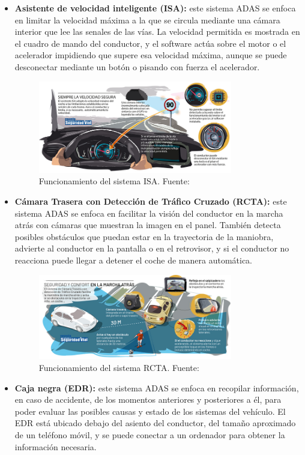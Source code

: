 \documentclass[12pt]{report} %
\begin{document}
\begin{itemize}
	\item \textbf{Asistente de velocidad inteligente (ISA):} este sistema ADAS se enfoca en limitar la velocidad máxima a la que se circula mediante una cámara interior que lee las senales de las vías. La velocidad permitida es mostrada en el cuadro de mando del conductor, y el software actúa sobre el motor o el acelerador impidiendo que supere esa velocidad máxima, aunque se puede desconectar mediante un botón o pisando con fuerza el acelerador.
    \begin{figure}[H]
		\centering
		\includegraphics[width=0.8\textwidth]{adasISA.jpg}
		\caption{Funcionamiento del sistema ISA. Fuente: \cite{adasObligatorios}}
		\label{fig:imagen12}
	\end{figure}
	\item \textbf{Cámara Trasera con Detección de Tráfico Cruzado (RCTA):} este sistema ADAS se enfoca en facilitar la visión del conductor en la marcha atrás con cámaras que muestran la imagen en el panel. También detecta posibles obstáculos que puedan estar en la trayectoria de la maniobra, advierte al conductor en la pantalla o en el retrovisor, y si el conductor no reacciona puede llegar a detener el coche de manera automática.
    \begin{figure}[H]
		\centering
		\includegraphics[width=0.8\textwidth]{adasRCTS.jpg}
		\caption{Funcionamiento del sistema RCTA. Fuente: \cite{adasObligatorios}}
		\label{fig:imagen13}
	\end{figure}
	\item \textbf{Caja negra (EDR):} este sistema ADAS se enfoca en recopilar información, en caso de accidente, de los momentos anteriores y posteriores a él, para poder evaluar las posibles causas y estado de los sistemas del vehículo. El EDR está ubicado debajo del asiento del conductor, del tamaño aproximado de un teléfono móvil, y se puede conectar a un ordenador para obtener la información necesaria.

\end{itemize}
\end{document}
